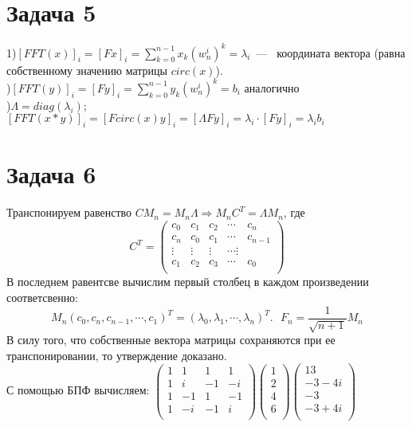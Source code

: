 \documentclass[a4paper,12pt]{article} %
\begin{document}
\section*{Задача 5} 
1)$
[FFT(x)]_{i}=[Fx]_i=\sum_{k=0}^{n-1}{x_k(w_n^i)^k} = \lambda_i
$~---~ координата вектора (равна собственному значению матрицы $circ(x)$).\\

)$
[FFT(y)]_{i}=[Fy]_i=\sum_{k=0}^{n-1}{y_k(w_n^i)^k} = b_i
$ аналогично\\

)$\Lambda = diag(\lambda_i)$;  $[FFT(x*y)]_i = [Fcirc(x)y]_i = [\Lambda Fy]_i = \lambda_i\cdot[Fy]_i = \lambda_ib_i$

\section*{Задача 6}
Транспонируем равенство $CM_n=M_n\Lambda \Rightarrow M_nC^T=\Lambda M_n$, где 
\[
C^T=
\begin{pmatrix}
c_0&c_1&c_2&\cdots&c_n\\
c_{n}&c_0&c_1&\cdots&c_{n-1}\\
\vdots&\vdots&\vdots&\cdots\vdots\\
c_1&c_2&c_3&\cdots&c_0\\
\end{pmatrix}
\]
В последнем равентсве вычислим первый столбец в каждом произведении соответсвенно:\\
\[M_n(c_0, c_n, c_{n-1}, \cdots, c_1)^T = (\lambda_0, \lambda_1, \cdots, \lambda_n)^T.~~~
F_n=\dfrac{1}{\sqrt{n+1}}M_n
\]
В силу того, что собственные вектора матрицы сохраняются при ее транспонировании, то утверждение доказано.\\

С помощью БПФ вычисляем:
$
\begin{pmatrix}
1&1&1&1\\
1&i&-1&-i\\
1&-1&1&-1\\
1&-i&-1&i\\
\end{pmatrix}
\begin{pmatrix}
1\\2\\4\\6\\
\end{pmatrix}
\begin{pmatrix}
13\\-3-4i\\-3\\-3+4i\\
\end{pmatrix}
$
\\
\end{document}
